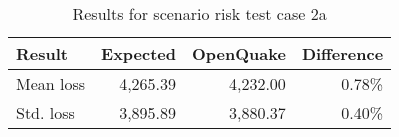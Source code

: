 \begin{table}[htbp]

\centering
\begin{tabular}{ l r r r }

\hline
\rowcolor{anti-flashwhite}
\bf{Result} & \bf{Expected} & \bf{OpenQuake} & \bf{Difference}\\
\hline
Mean loss & 4,265.39 & 4,232.00 & 0.78\% \\
Std. loss & 3,895.89 & 3,880.37 & 0.40\% \\
\hline
\end{tabular}

\caption{Results for scenario risk test case 2a}
\label{tab:result-scenario-risk-2a}
\end{table}